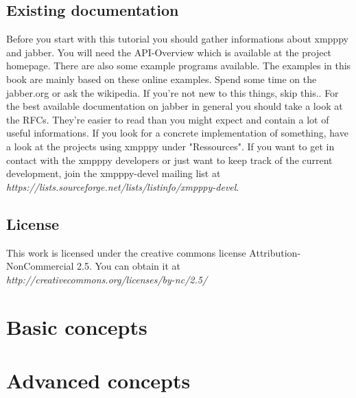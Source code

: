 \documentclass[a4paper,10pt]{report}
\begin{document}
\section{Existing documentation}
Before you start with this tutorial you should gather informations about xmpppy and jabber.
You will need the API-Overview which is available at the project homepage. There are also some example programs available. The examples in this book are mainly based on these online examples.
\newline
\newline
Spend some time on the jabber.org or ask the wikipedia. If you're not new to this things, skip this..
\newline
\newline
For the best available documentation on jabber in general you should take a look at the RFCs. They're easier to read than you might expect and contain a lot of useful informations.
\newline
\newline
If you look for a concrete implementation of something, have a look at the projects using xmpppy under "Ressources".
\newline
\newline
If you want to get in contact with the xmpppy developers or just want to keep track of the current development, join the xmpppy-devel mailing list at \textit{https://lists.sourceforge.net/lists/listinfo/xmpppy-devel}.

\section{License}

This work is licensed under the creative commons license Attribution-NonCommercial 2.5.
You can obtain it at \textit{http://creativecommons.org/licenses/by-nc/2.5/}





\chapter{Basic concepts}






\chapter{Advanced concepts}





\newpage
\end{document}
